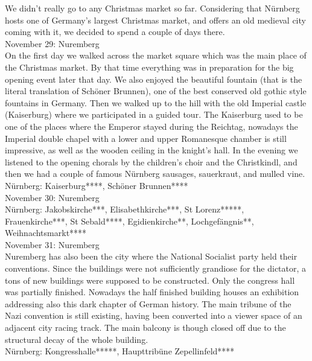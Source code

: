 We didn't really go to any Christmas market so far. Considering that N\"urnberg hosts one of Germany's largest Christmas market, and offers an old medieval city coming with it, we decided to spend a couple of days there.\\

November 29: Nuremberg\\
On the first day we walked across the market square which was the main place of the Christmas market. By that time everything was in preparation for the big opening event later that day. We also enjoyed the beautiful fountain (that is the literal translation of Sch\"oner Brunnen), one of the best conserved old gothic style fountains in Germany. Then we walked up to the hill with the old Imperial castle (Kaiserburg) where we participated in a guided tour. The Kaiserburg used to be one of the places where the Emperor stayed during the Reichtag, nowadays the Imperial double chapel with a lower and upper Romanesque chamber is still impressive, as well as the wooden ceiling in the knight's hall. In the evening we listened to the opening chorals by the children's choir and the Christkindl, and then we had a couple of famous N\"urnberg sausages, sauerkraut, and mulled vine.\\

N\"urnberg: Kaiserburg****, Sch\"oner Brunnen****\\

November 30: Nuremberg\\
N\"urnberg: Jakobskirche***, Elisabethkirche***, St Lorenz*****, Frauenkirche***, St Sebald****, Egidienkirche**, Lochgef\"angnis**, Weihnachtsmarkt****\\

November 31: Nuremberg\\
Nuremberg has also been the city where the National Socialist party held their conventions. Since the buildings were not sufficiently grandiose for the dictator, a tons of new buildings were supposed to be constructed. Only the congress hall was partially finished. Nowadays the half finished building houses an exhibition addressing also this dark chapter of German history. The main tribune of the Nazi convention is still existing, having been converted into a viewer space of an adjacent city racing track. The main balcony is though closed off due to the structural decay of the whole building.\\

N\"urnberg: Kongresshalle*****, Haupttrib\"une Zepellinfeld****

